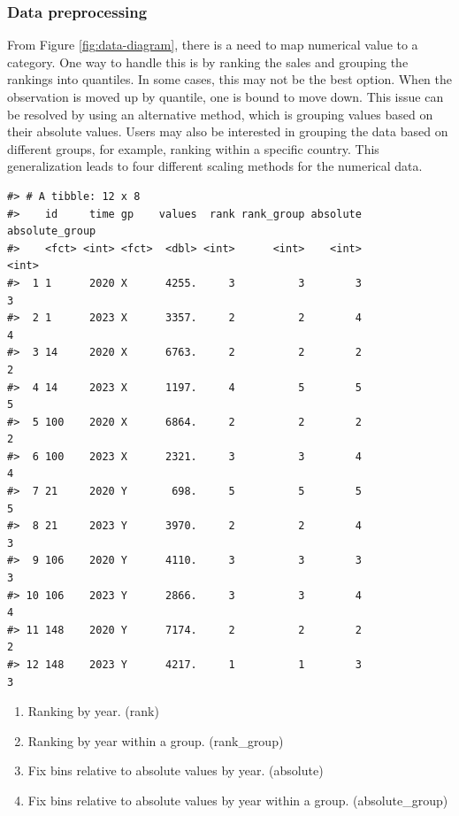 \hypertarget{data-preprocessing}{%
\subsubsection{Data preprocessing}\label{data-preprocessing}}

From Figure \ref{fig:data-diagram}, there is a need to map numerical value to a category. One way to handle this is by ranking the sales and grouping the rankings into quantiles. In some cases, this may not be the best option. When the observation is moved up by quantile, one is bound to move down. This issue can be resolved by using an alternative method, which is grouping values based on their absolute values. Users may also be interested in grouping the data based on different groups, for example, ranking within a specific country. This generalization leads to four different scaling methods for the numerical data.

\begin{verbatim}
#> # A tibble: 12 x 8
#>    id     time gp    values  rank rank_group absolute absolute_group
#>    <fct> <int> <fct>  <dbl> <int>      <int>    <int>          <int>
#>  1 1      2020 X      4255.     3          3        3              3
#>  2 1      2023 X      3357.     2          2        4              4
#>  3 14     2020 X      6763.     2          2        2              2
#>  4 14     2023 X      1197.     4          5        5              5
#>  5 100    2020 X      6864.     2          2        2              2
#>  6 100    2023 X      2321.     3          3        4              4
#>  7 21     2020 Y       698.     5          5        5              5
#>  8 21     2023 Y      3970.     2          2        4              3
#>  9 106    2020 Y      4110.     3          3        3              3
#> 10 106    2023 Y      2866.     3          3        4              4
#> 11 148    2020 Y      7174.     2          2        2              2
#> 12 148    2023 Y      4217.     1          1        3              3
\end{verbatim}

\begin{enumerate}
\def\labelenumi{\arabic{enumi}.}
\tightlist
\item
  Ranking by year. (rank)
\item
  Ranking by year within a group. (rank\_group)
\item
  Fix bins relative to absolute values by year. (absolute)
\item
  Fix bins relative to absolute values by year within a group. (absolute\_group)
\end{enumerate}

